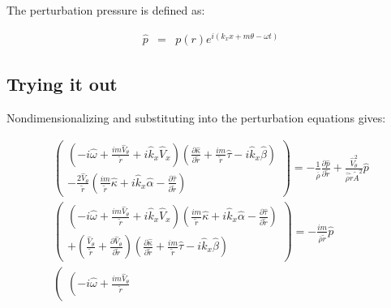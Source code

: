 The perturbation pressure is defined as:

\begin{eqnarray}
\widehat{p} &=& p \left(r \right) 
e^{i \left(k_x x + m \theta - \omega t \right)} 
\nonumber
\end{eqnarray}

\subsection{Trying it out}

Nondimensionalizing and substituting into the perturbation equations gives:

\begin{small}
\begin{eqnarray}
\left(
\begin{array}{r}
\left(
-i \widehat{\omega} 
+ \frac{i m \widehat{V}_{\theta}}{\widetilde{r}}
+i \widehat{k}_x \widehat{V}_x 
\right) 
\left(
\frac{\partial \widehat{\kappa}}{\partial \widetilde{r}}
+
\frac{i m}{\widetilde{r}}
\widehat{\tau}
-
i \widehat{k}_x \widehat{\beta}
\right) 
\\
-\frac{2 \widehat{V}_{\theta}}{\widetilde{r}} 
\left(
\frac{i m}{\widetilde{r}} \widehat{\kappa}
+
i \widehat{k}_x \widehat{\alpha}
-
\frac{\partial \widehat{\tau}}{\partial \widetilde{r}}
\right) 
\end{array}
\right)
 = 
-\frac{1}{\widehat{\overline{\rho}}} \frac{\partial \widehat{p}}{\partial \widetilde{r}}
+\frac{\widehat{V}_{\theta}^2}{\widehat{\overline{\rho}} \widetilde{r} \widetilde{A}^2} 
\widehat{p}
\nonumber
\\
\left(
\begin{array}{r}
\left(
-i \widehat{\omega} 
+ \frac{i m \widehat{V}_{\theta}}{\widetilde{r}}
+i \widehat{k}_x \widehat{V}_x 
\right) 
\left(
\frac{i m}{\widetilde{r}} \widehat{\kappa}
+
i \widehat{k}_x \widehat{\alpha}
-
\frac{\partial \widehat{\tau}}{\partial \widetilde{r}}
\right) 
\\
+
\left(
\frac{\widehat{V}_{\theta}}{\widetilde{r}}
+\frac{\partial \widehat{V}_{\theta}}{\partial \widetilde{r}}
\right) 
\left(
\frac{\partial \widehat{\kappa}}{\partial \widetilde{r}}
+
\frac{i m}{\widetilde{r}}
\widehat{\tau}
-
i \widehat{k}_x \widehat{\beta}
\right) 
\end{array}
\right)
 = 
-\frac{i m}{\widehat{\overline{\rho}} \widetilde{r}} \widehat{p}
\nonumber
\\
\left(
\begin{array}{r}
\left(
-i \widehat{\omega}
+ \frac{i m \widehat{V}_{\theta}}{\widetilde{r}}

\end{array}
\end{eqnarray}
\end{small}
